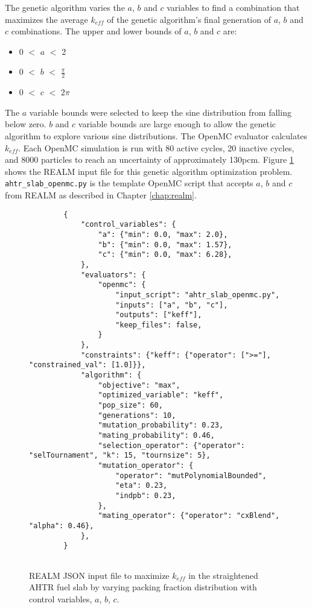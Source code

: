 The genetic algorithm varies the $a$, $b$ and $c$ variables to find a combination 
that maximizes the average $k_{eff}$ of the genetic algorithm's final generation 
of $a$, $b$ and $c$ combinations.
The upper and lower bounds of $a$, $b$ and $c$ are: 
\begin{itemize}
    \item 0 $<$ $a$ $<$ 2 
    \item 0 $<$ $b$ $<$ $\frac{\pi}{2}$
    \item 0 $<$ $c$ $<$ $2\pi$
\end{itemize}
The $a$ variable bounds were selected to keep the sine distribution from falling 
below zero. $b$ and $c$ variable bounds are large enough to allow the genetic 
algorithm to explore various sine distributions. 
The OpenMC evaluator calculates $k_{eff}$. 
Each OpenMC simulation is run with 80 active cycles, 20 inactive cycles, and 
8000 particles to reach an uncertainty of approximately 130pcm. 
Figure \ref{fig:realm-input-simple} shows the REALM input file for this 
genetic algorithm optimization problem. 
\texttt{ahtr\_slab\_openmc.py} is the template OpenMC script that accepts 
$a$, $b$ and $c$ from REALM as described in Chapter \ref{chap:realm}. 
\begin{figure}[]
    \begin{verbatim}
        {
            "control_variables": {
                "a": {"min": 0.0, "max": 2.0},
                "b": {"min": 0.0, "max": 1.57},
                "c": {"min": 0.0, "max": 6.28},
            },
            "evaluators": {
                "openmc": {
                    "input_script": "ahtr_slab_openmc.py",
                    "inputs": ["a", "b", "c"],
                    "outputs": ["keff"],
                    "keep_files": false,
                }
            },
            "constraints": {"keff": {"operator": [">="], "constrained_val": [1.0]}},
            "algorithm": {
                "objective": "max",
                "optimized_variable": "keff",
                "pop_size": 60,
                "generations": 10,
                "mutation_probability": 0.23,
                "mating_probability": 0.46,
                "selection_operator": {"operator": "selTournament", "k": 15, "tournsize": 5},
                "mutation_operator": {
                    "operator": "mutPolynomialBounded",
                    "eta": 0.23,
                    "indpb": 0.23,
                },
                "mating_operator": {"operator": "cxBlend", "alpha": 0.46},
            },
        }
        
    \end{verbatim}
    \caption{\acrfull{REALM} JSON input file to maximize $k_{eff}$ in the 
    straightened \acrfull{AHTR} fuel slab by varying packing fraction distribution 
    with control variables, $a$, $b$, $c$.}
    \label{fig:realm-input-simple}
\end{figure}


